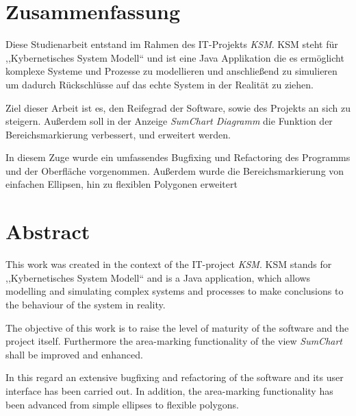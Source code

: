 \section*{Zusammenfassung}

Diese Studienarbeit entstand im Rahmen des IT-Projekts  \emph{KSM}. KSM steht für ,,Kybernetisches System Modell`` und ist eine Java Applikation die es ermöglicht komplexe Systeme und Prozesse zu modellieren und anschließend zu simulieren um dadurch Rückschlüsse auf das echte System in der Realität zu ziehen.

Ziel dieser Arbeit ist es, den Reifegrad der Software, sowie des Projekts an sich zu steigern. Außerdem soll in der Anzeige \emph{SumChart Diagramm} die Funktion der Bereichsmarkierung verbessert, und erweitert werden.

In diesem Zuge wurde ein umfassendes Bugfixing und Refactoring des Programms und der Oberfläche vorgenommen. Außerdem wurde die Bereichsmarkierung von einfachen Ellipsen, hin zu flexiblen Polygonen erweitert
\newpage
\section*{Abstract}

This work was created in the context of the IT-project \emph{KSM}. KSM stands for ,,Kybernetisches System Modell`` and is a Java application, which allows modelling and simulating complex systems and processes to make conclusions to the behaviour of the system in reality.

The objective of this work is to raise the level of maturity of the software and the project itself. Furthermore the area-marking functionality of the view \emph{SumChart} shall be improved and enhanced.

In this regard an extensive bugfixing and refactoring of the software and its user interface has been carried out. In addition, the area-marking functionality has been advanced from simple ellipses to flexible polygons.